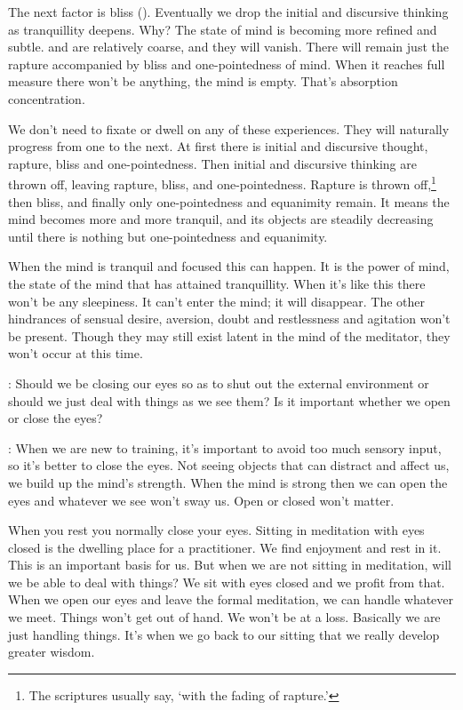 The next factor is bliss (). Eventually we drop the initial and discursive thinking as tranquillity deepens. Why? The state of mind is becoming more refined and subtle.  and  are relatively coarse, and they will vanish. There will remain just the rapture accompanied by bliss and one-pointedness of mind. When it reaches full measure there won't be anything, the mind is empty. That's absorption concentration. 

We don't need to fixate or dwell on any of these experiences. They will naturally progress from one to the next. At first there is initial and discursive thought, rapture, bliss and one-pointedness. Then initial and discursive thinking are thrown off, leaving rapture, bliss, and one-pointedness. Rapture is thrown off,\footnote{The scriptures usually say, `with the fading of rapture.'} then bliss, and finally only one-pointedness and equanimity remain. It means the mind becomes more and more tranquil, and its objects are steadily decreasing until there is nothing but one-pointedness and equanimity. 

When the mind is tranquil and focused this can happen. It is the power of mind, the state of the mind that has attained tranquillity. When it's like this there won't be any sleepiness. It can't enter the mind; it will disappear. The other hindrances of sensual desire, aversion, doubt and restlessness and agitation won't be present. Though they may still exist latent in the mind of the meditator, they won't occur at this time. 

: Should we be closing our eyes so as to shut out the external environment or should we just deal with things as we see them? Is it important whether we open or close the eyes? 

: When we are new to training, it's important to avoid too much sensory input, so it's better to close the eyes. Not seeing objects that can distract and affect us, we build up the mind's strength. When the mind is strong then we can open the eyes and whatever we see won't sway us. Open or closed won't matter. 

When you rest you normally close your eyes. Sitting in meditation with eyes closed is the dwelling place for a practitioner. We find enjoyment and rest in it. This is an important basis for us. But when we are not sitting in meditation, will we be able to deal with things? We sit with eyes closed and we profit from that. When we open our eyes and leave the formal meditation, we can handle whatever we meet. Things won't get out of hand. We won't be at a loss. Basically we are just handling things. It's when we go back to our sitting that we really develop greater wisdom. 

